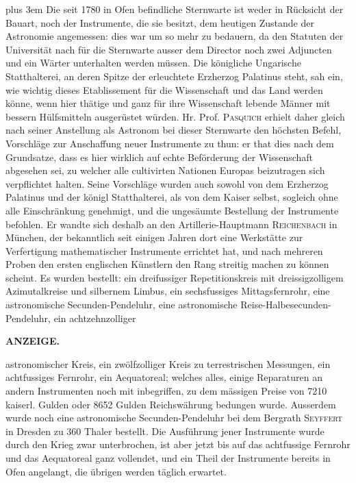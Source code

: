 {\rightskip=0pt plus 3em Die seit 1780 in Ofen befindliche Sternwarte ist weder in Rücksicht der Bauart, noch der Instrumente, die sie besitzt, dem heutigen Zustande der Astronomie angemessen: dies war um so mehr zu bedauern, da den Statuten der Universität nach für die Sternwarte ausser dem Director noch zwei Adjuncten und ein Wärter unterhalten werden müssen. Die königliche Ungarische Statthalterei, an deren Spitze der erleuchtete Erzherzog Palatinus steht, sah ein, wie wichtig dieses Etablissement für die Wissenschaft und das Land werden könne, wenn hier thätige und ganz für ihre Wissenschaft lebende Männer mit bessern Hülfsmitteln ausgerüstet würden. Hr. Prof. \textsc{Pasquich} erhielt daher gleich nach seiner Anstellung als Astronom bei dieser Sternwarte den höchsten Befehl, Vorschläge zur Anschaffung neuer Instrumente zu thun: er that dies nach dem Grundsatze, dass es hier wirklich auf echte Beförderung der Wissenschaft abgesehen sei, zu welcher alle cultivirten Nationen Europas beizutragen sich verpflichtet halten. Seine Vorschläge wurden auch sowohl von dem Erzherzog Palatinus und der königl Statthalterei, als von dem Kaiser selbst, sogleich ohne alle Einschränkung genehmigt, und die ungesäumte Bestellung der Instrumente befohlen. Er wandte sich deshalb an den Artillerie-Hauptmann \textsc{Reichenbach} in München, der bekanntlich seit einigen Jahren dort eine Werkstätte zur Verfertigung mathematischer Instrumente errichtet hat, und nach mehreren Proben den ersten englischen Künstlern den Rang streitig machen zu können scheint. Es wurden bestellt: ein dreifussiger Repetitionskreis mit dreissigzolligem Azimutalkreise und silbernem Limbus, ein sechsfussiges Mittagsfernrohr, eine astronomische Secunden-Pendeluhr, eine astronomische Reise-Halbesecunden-Pendeluhr, ein achtzehnzolliger\par
{}
\clearpage
\thispagestyle{empty}
\noindent{}%
%
\parbox[t]{\dimexpr\linewidth-24mm\relax}{\centering\footnotesize\bfseries ANZEIGE.\par}%
\makebox[12mm][r]{}\par\nobreak\medskip
\noindent astronomischer Kreis, ein zwölfzolliger Kreis zu terrestrischen Messungen, ein achtfussiges Fernrohr, ein Aequatoreal; welches alles, einige Reparaturen an andern Instrumenten noch mit inbegriffen, zu dem mässigen Preise von 7210 kaiserl. Gulden oder 8652 Gulden Reichswährung bedungen wurde. Ausserdem wurde noch eine astronomische Secunden-Pendeluhr bei dem Bergrath \textsc{Seyffert} in Dresden zu 360 Thaler bestellt. Die Ausführung jener Instrumente wurde durch den Krieg zwar unterbrochen, ist aber jetzt bis auf das achtfussige Fernrohr und das Aequatoreal ganz vollendet, und ein Theil der Instrumente bereits in Ofen angelangt, die übrigen werden täglich erwartet.\par}


